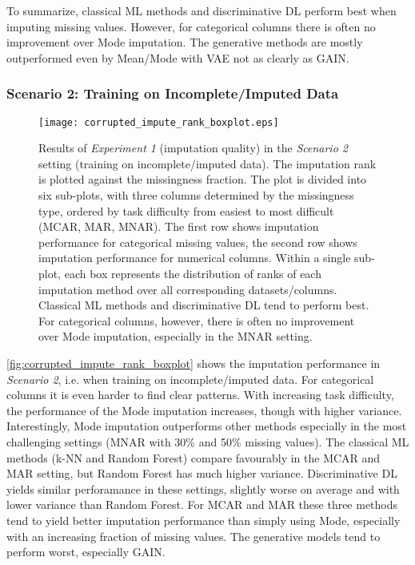 To summarize, classical ML methods and discriminative DL perform best when imputing missing values. However, for categorical columns there is often no improvement over Mode imputation. The generative methods are mostly outperformed even by Mean/Mode with VAE not as clearly as GAIN.


\subsubsection{Scenario 2: Training on Incomplete/Imputed Data}


\begin{figure}\centering
    \texttt{[image: corrupted\_impute\_rank\_boxplot.eps]}

    \caption[Imputation Ranks - Corrupted]{Results of \textit{Experiment 1} (imputation quality) in the \textit{Scenario 2} setting (training on incomplete/imputed data). The imputation rank is plotted against the missingness fraction. The plot is divided into six sub-plots, with three columns determined by the missingness type, ordered by task difficulty from easiest to most difficult (MCAR, MAR, MNAR). The first row shows imputation performance for categorical missing values,  the second row shows imputation performance for numerical columns. Within a single sub-plot, each box represents the distribution of ranks of each imputation method over all corresponding datasets/columns. Classical ML methods and discriminative DL tend to perform best. For categorical columns, however, there is often no improvement over Mode imputation, especially in the MNAR setting.
    }
	\label{fig:corrupted_impute_rank_boxplot}
\end{figure}

\autoref{fig:corrupted_impute_rank_boxplot} shows the imputation performance in \textit{Scenario 2}, i.e. when training on incomplete/imputed data. For categorical columns it is even harder to find clear patterns. With increasing task difficulty, the performance of the Mode imputation increases, though with higher variance. Interestingly, Mode imputation outperforms other methods especially in the most challenging settings (MNAR with 30\% and 50\% missing values). The classical ML methods (k-NN and Random Forest) compare favourably in the MCAR and MAR setting, but Random Forest has much higher variance. Discriminative DL yields similar perforamance in these settings, slightly worse on average and with lower variance than Random Forest. For MCAR and MAR these three methods tend to yield better imputation performance than simply using Mode, especially with an increasing fraction of missing values. The generative models tend to perform worst, especially GAIN.


